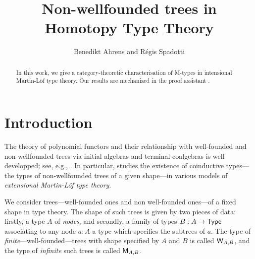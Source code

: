 \documentclass[envcountsame]{llncs}
\begin{document}
\title{Non-wellfounded trees in Homotopy Type Theory}

\author{Benedikt Ahrens and R\'egis Spadotti}


\newcommand{\fat}[1]{\textbf{#1}}
\newcommand{\M}{\constfont{M}}
\newcommand{\W}{\constfont{W}}
\renewcommand{\root}{\constfont{root}}
\newcommand{\br}{\constfont{br}}
\newcommand{\transport}{\constfont{transport}}
\newcommand{\True}{\constfont{\top}}
\newcommand{\False}{\constfont{\bot}}


\maketitle


\begin{abstract}


 In this work, we give a category-theoretic characterisation of \textsf{M}-types in intensional Martin-L\"of type theory.
 Our results are mechanized in the proof assistant \coq.
   
  
  \end{abstract}


\section{Introduction}

The theory of polynomial functors and their relationship with well-founded and non-wellfounded trees via initial algebras and terminal coalgebras is
well developped; see, e.g., \parencite{jacobs1997tutorial, DBLP:journals/apal/MoerdijkP00, DBLP:journals/apal/BergM07}.
In particular, \textcite{DBLP:conf/calco/Marchi05} studies the existence of coinductive types---the types of non-wellfounded trees of a given shape---in
various models of \emph{extensional Martin-L\"of type theory}.



We consider trees---well-founded ones and non well-founded ones---of a fixed shape in type theory.
The shape of such trees is given by two pieces of data: firstly, a type $A$ of \emph{nodes}, and secondly,
a family of types $B : A \to \mathsf{Type}$ associating to any node $a : A$ a type which specifies the subtrees of $a$.
The type of \emph{finite}---well-founded---trees with shape specified by $A$ and $B$ is called $\W_{A,B}$,
and the type of \emph{infinite} such trees is called $\M_{A,B}$. 
\end{document}
